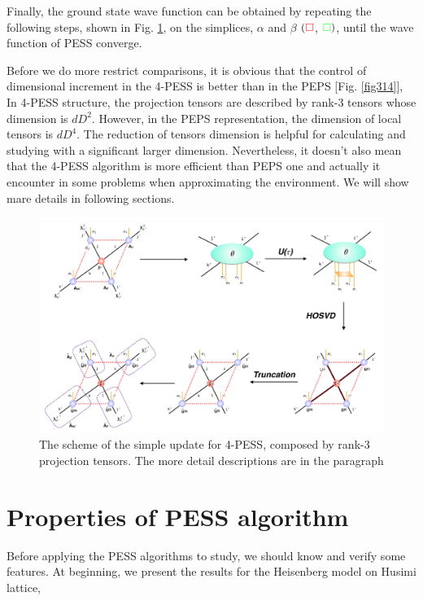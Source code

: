 Finally, the ground state wave function can be obtained by repeating the following steps, shown in Fig. \ref{fig4326}, on the simplices, $\alpha$ and $\beta$ $( \color{red} \square$, ${\color{green} \square})$, until the wave function of PESS converge.

Before we do more restrict comparisons, it is obvious that the control of dimensional increment in the 4-PESS is better than in the PEPS [Fig. \ref{fig314}], In 4-PESS structure, the projection tensors are described by rank-3 tensors whose dimension is $dD^2$. However, in the PEPS representation, the dimension of local tensors is $dD^4$. The reduction of tensors dimension is helpful for calculating and studying with a significant larger dimension. Nevertheless, it doesn't also mean that the 4-PESS algorithm is more efficient than PEPS one and actually it encounter in some problems when approximating the environment. We will show mare details in following sections.

\begin{figure}[ht]
	\centering
	\includegraphics[width=1.00\textwidth]{figures/fig4326.png}
	\caption[The scheme of the simple update for 4-PESS, composed by rank-3 projection tensors.]{The scheme of the simple update for 4-PESS, composed by rank-3 projection tensors. The more detail descriptions are in the paragraph}
	\label{fig4326}
\end{figure}

\section{Properties of PESS algorithm}

Before applying the PESS algorithms to study, we should know and verify some features. At beginning, we present the results for the Heisenberg model on Husimi lattice,

